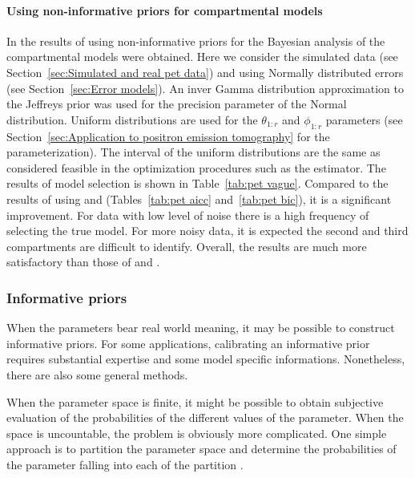 \paragraph{Using non-informative priors for \pet compartmental models}

In \cite{Zhou2013} the results of using non-informative priors for the
Bayesian analysis of the \pet compartmental models were obtained. Here we
consider the simulated data (see Section~\ref{sec:Simulated and real pet
data}) and using Normally distributed errors (see Section~\ref{sec:Error
models}). An inver Gamma distribution approximation to the Jeffreys prior was
used for the precision parameter of the Normal distribution. Uniform
distributions are used for the $\theta_{1:r}$ and $\phi_{1:r}$ parameters
(see Section~\ref{sec:Application to positron emission tomography} for the
parameterization). The interval of the uniform distributions are the same as
considered feasible in the optimization procedures such as the \nls
estimator. The results of model selection is shown in Table~\ref{tab:pet
vague}. Compared to the results of using \aicc and \bic (Tables~\ref{tab:pet
aicc} and~\ref{tab:pet bic}), it is a significant improvement. For data with
low level of noise there is a high frequency of selecting the true model. For
more noisy data, it is expected the second and third compartments are
difficult to identify. Overall, the results are much more satisfactory than
those of \aicc and \bic.



\subsubsection{Informative priors}
\label{ssub:Informative priors}

When the parameters bear real world meaning, it may be possible to construct
informative priors. For some applications, calibrating an informative prior
requires substantial expertise and some model specific informations.
Nonetheless, there are also some general methods.

When the parameter space is finite, it might be possible to obtain subjective
evaluation of the probabilities of the different values of the parameter.
When the space is uncountable, the problem is obviously more complicated. One
simple approach is to partition the parameter space and determine the
probabilities of the parameter falling into each of the partition
\cite[][sec.~3.2.2]{Robert:2007tc}.

